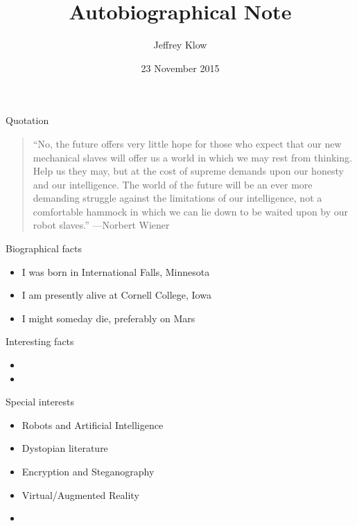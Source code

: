 \documentclass{beamer}
\title{Autobiographical Note}
\author{Jeffrey Klow}
\institute{Cornell College}
\date{23 November 2015}
\begin{document}
\begin{frame}
  \titlepage
\end{frame}

\begin{frame}{Quotation}
\begin{quotation}
\noindent
``No, the future offers very little hope for those who expect that our
  new mechanical slaves will offer us a world in which we may rest
  from thinking. Help us they may, but at the cost of supreme demands
  upon our honesty and our intelligence.  The world of the future will
  be an ever more demanding struggle against the limitations of our
  intelligence, not a comfortable hammock in which we can lie down to
  be waited upon by our robot slaves.''
  \flushright
  ---Norbert Wiener
  \end{quotation}
\end{frame}

\begin{frame}{Biographical facts}
\begin{itemize}
  \item I was born in International Falls, Minnesota
  \item I am presently alive at Cornell College, Iowa
  \item I might someday die, preferably on Mars
  \end{itemize}
\end{frame}

\begin{frame}{Interesting facts}
\begin{itemize}
  \item 
  \item 
  \end{itemize}
\end{frame}

\begin{frame}{Special interests}
\begin{itemize}
  \item Robots and Artificial Intelligence
  \item Dystopian literature
  \item Encryption and Steganography
  \item Virtual/Augmented Reality
  \item 
  \end{itemize}
\end{frame}
\end{document}
